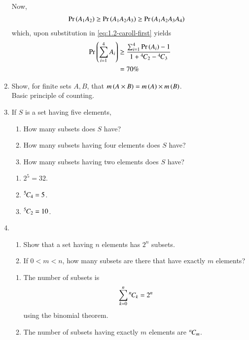 \begin{enumerate}[label=\arabic*.,ref=\thesubsection.\theenumi]
Now, 
\begin{align}
	\Pr\left(A_1A_2\right) &\ge \Pr\left(A_1A_2A_3\right) \ge \Pr\left(A_1A_2A_3A_4\right)
\end{align}
which, upon substitution in 
	\eqref{eq:1.2-caroll-first}
	yields
	\begin{align}
		\Pr\left(\sum_{i=1}^{4}A_i\right) &\ge \frac{\sum_{i=1}^{4}\Pr\left(A_i\right)-1 }{1 + {{}^{4}\mkern-1muC_{2}}-{{}^{4}\mkern-1muC_{3}}}
		\\
		&= 70\%
	\end{align}
\item Show, for finite sets $A, B$, that $m\left(A \times B\right) = m\left(A\right) \times m\left(B\right)$.
	\\
	\solution  Basic principle of counting.
\item If $S$ is a set having five elements, 
\begin{enumerate}
	\item How many subsets does $S$ have?
	\item How many subsets having four elements does $S$ have?
	\item How many subsets having two elements does $S$ have?
\end{enumerate}
\solution 
\begin{enumerate}
	\item $2^5 = 32$.
	\item ${{}^{5}\mkern-1muC_{4}} = 5$.
	\item ${{}^{5}\mkern-1muC_{2}} = 10$.
\end{enumerate}
\item 
\begin{enumerate}
	\item Show that a set having $n$ elements has $2^n$ subsets.
	\item If $0 < m < n$, how many subsets are there that have exactly $m$ elements?
\end{enumerate}
\solution
\begin{enumerate}
	\item The number of subsets is 
		\begin{align}
			\sum_{k=0}^{n}{{}^{n}\mkern-1muC_{k}} = 2^n
		\end{align}
		using the binomial theorem.
	\item The number of subsets having exactly $m$ elements are ${{}^{n}\mkern-1muC_{m}}$.
\end{enumerate}
\end{enumerate}
